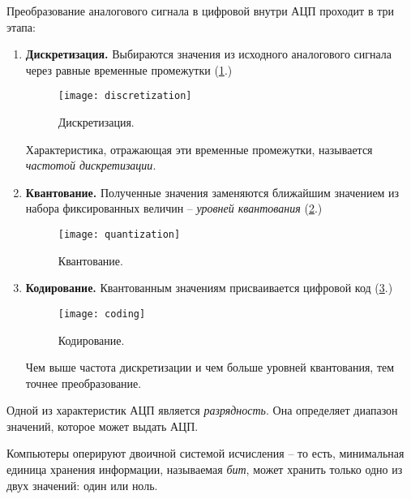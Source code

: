 \documentclass[../sparc.tex]{subfiles}
\begin{document}

Преобразование аналогового сигнала в цифровой внутри АЦП проходит в три этапа:
\begin{enumerate}

\item \textbf{Дискретизация.} Выбираются значения из исходного аналогового сигнала через
  равные временные промежутки (\ref{fig:discretization}.)

  \begin{figure}[h]
    \centering
    \texttt{[image: discretization]}
    \caption{Дискретизация.}
    \label{fig:discretization}
  \end{figure}

  Характеристика, отражающая эти временные промежутки, называется \emph{частотой
  дискретизации}.

\item \textbf{Квантование.} Полученные значения заменяются ближайшим значением из
  набора фиксированных величин -- \emph{уровней квантования}
  (\ref{fig:quantization}.)

  \begin{figure}[h]
    \texttt{[image: quantization]}
    \caption{Квантование.}
    \label{fig:quantization}
    \centering
  \end{figure}

\item \textbf{Кодирование.} Квантованным значениям присваивается цифровой код
  (\ref{fig:coding}.)

  \begin{figure}[h]
    \texttt{[image: coding]}
    \caption{Кодирование.}
    \label{fig:coding}
    \centering
  \end{figure}

  Чем выше частота дискретизации и чем больше уровней квантования, тем точнее
  преобразование.

\end{enumerate}

Одной из характеристик АЦП является \emph{разрядность}.  Она определяет диапазон
значений, которое может выдать АЦП.

Компьютеры оперируют двоичной системой исчисления -- то есть, минимальная единица
хранения информации, называемая \emph{бит}, может хранить только одно из двух
значений: один или ноль.
\end{document}
